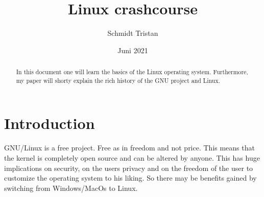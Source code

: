 \documentclass{article}
\title{Linux crashcourse}
\author{Schmidt Tristan }
\date{Juni 2021}
\begin{document}
\maketitle
\clearpage
\tableofcontents
\clearpage
\begin{abstract}
    In this document one will learn the basics of the Linux operating system. Furthermore, my paper will shorty explain the rich history of the GNU project and Linux.
\end{abstract}
\section{Introduction}
GNU/Linux is a free project. Free as in freedom and not price. This means that the kernel is completely open source and can be altered by anyone. This has huge implications on security, on the users privacy and on the freedom of the user to customize the operating system to his liking. So there may be benefits gained by switching from Windows/MacOs to Linux.     
\end{document}

